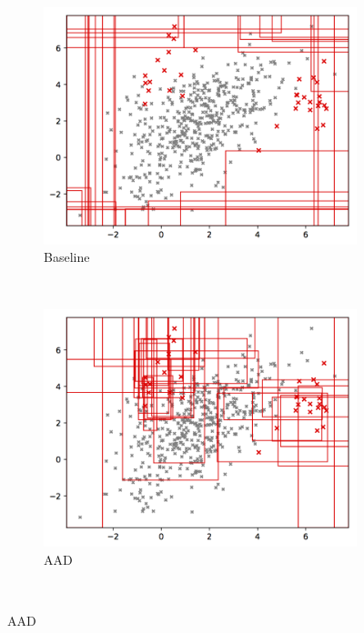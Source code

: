 \documentclass{article} %
\begin{document}
\begin{figure}
	\centering
	\begin{subfigure}[b]{0.3\textwidth}
		\includegraphics[width=\textwidth]{top_30_anomalous_regions_100_trees_baseline}
		\caption{Baseline}
		\label{fig:baseline_rects}
	\end{subfigure}
	~ %
	\begin{subfigure}[b]{0.3\textwidth}
		\includegraphics[width=\textwidth]{top_30_anomalous_regions_100_trees_aad}
		\caption{AAD}
		\label{fig:aad_rects}
	\end{subfigure}
	~ %

\end{figure}
\end{document}
